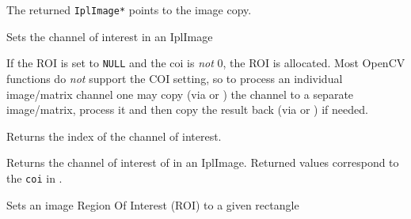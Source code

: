 The returned \texttt{IplImage*} points to the image copy.

\label{SetImageCOI}

Sets the channel of interest in an IplImage


\begin{description}
\end{description}

If the ROI is set to \texttt{NULL} and the coi is \textit{not} 0, the ROI is allocated. Most OpenCV functions do \textit{not} support the COI setting, so to process an individual image/matrix channel one may copy (via  or ) the channel to a separate image/matrix, process it and then copy the result back (via  or ) if needed.

\label{GetImageCOI}

Returns the index of the channel of interest. 


\begin{description}
\end{description}

Returns the channel of interest of in an IplImage. Returned values correspond to the \texttt{coi} in .


Sets an image Region Of Interest (ROI) to a given rectangle


\begin{description}
\end{description}

